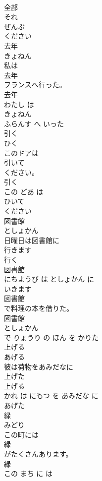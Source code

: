 \documentclass[8pt]{extreport}
\begin{document}
\begin{CJK}{UTF8}{min}
\\	全部 
\\	それ 
\\	ぜんぶ
\\	ください	
\\	去年	
\\	きょねん	
\\	私は
\\	去年
\\	フランスへ行った。	
\\	去年 
\\	わたし は 
\\	きょねん
\\	ふらんす へ いった	
\\	引く	
\\	ひく	
\\	このドアは
\\	引いて
\\	ください。	
\\	引く 
\\	この どあ は 
\\	ひいて
\\	ください	
\\	図書館	
\\	としょかん	
\\	日曜日は図書館に
\\	行きます
\\	行く 
\\	図書館 
\\	にちようび は としょかん に 
\\	いきます
\\	図書館
\\	で料理の本を借りた。	
\\	図書館 
\\	としょかん
\\	で りょうり の ほん を かりた	
\\	上げる	
\\	あげる	
\\	彼は荷物をあみだなに
\\	上げた
\\	上げる 
\\	かれ は にもつ を あみだな に 
\\	あげた
\\	緑	
\\	みどり	
\\	この町には
\\	緑
\\	がたくさんあります。	
\\	緑 
\\	この まち に は 

\end{CJK}
\end{document}
